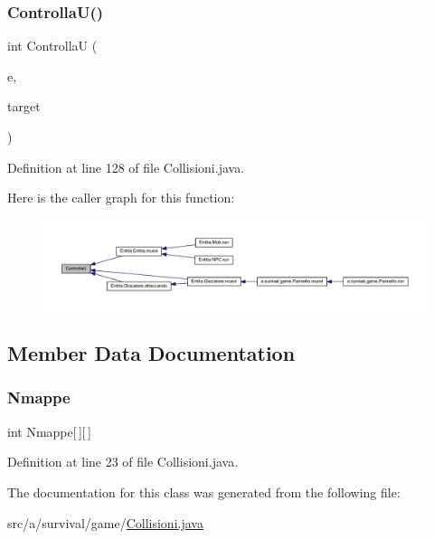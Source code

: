 \subsubsection{\texorpdfstring{Controlla\+U()}{ControllaU()}}
{\footnotesize\ttfamily int ControllaU (\begin{DoxyParamCaption}\item[{\hyperlink{class_entita_1_1_entita}{Entita}}]{e,  }\item[{Array\+List$<$ \hyperlink{class_entita_1_1_entita}{Entita} $>$}]{target }\end{DoxyParamCaption})}



Definition at line 128 of file Collisioni.\+java.

Here is the caller graph for this function\+:
\nopagebreak
\begin{figure}[H]
\begin{center}
\leavevmode
\includegraphics[width=350pt]{classa_1_1survival_1_1game_1_1_collisioni_a87a22cc62f824d7a4e9a017a9b36b019_icgraph}
\end{center}
\end{figure}


\subsection{Member Data Documentation}
\mbox{\label{classa_1_1survival_1_1game_1_1_collisioni_ac67a253aa050f8b036b79e9613b946e9}} 
\subsubsection{\texorpdfstring{Nmappe}{Nmappe}}
{\footnotesize\ttfamily int Nmappe\mbox{[}$\,$\mbox{]}\mbox{[}$\,$\mbox{]}}



Definition at line 23 of file Collisioni.\+java.



The documentation for this class was generated from the following file\+:\begin{DoxyCompactItemize}
\item 
src/a/survival/game/\hyperlink{_collisioni_8java}{Collisioni.\+java}\end{DoxyCompactItemize}
